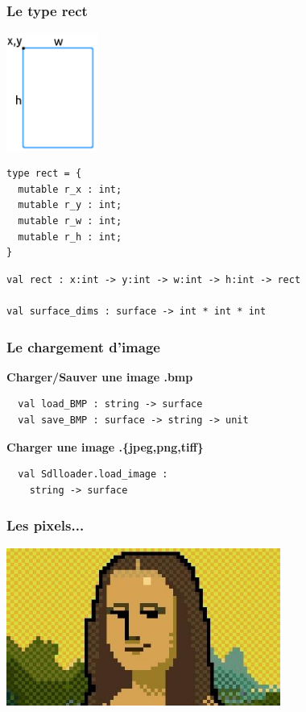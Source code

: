 \begin{frame}[fragile]
	\frametitle{Le type rect}
	\begin{center}\begin{minipage}{0.4\textwidth}
		\includegraphics[width=3cm]{pics/rect.png}
	\end{minipage}
	\begin{minipage}{0.4\textwidth}
		\lstset{basicstyle=\footnotesize}
		\begin{lstlisting}
type rect = {
  mutable r_x : int;
  mutable r_y : int;
  mutable r_w : int;
  mutable r_h : int;
} 
		\end{lstlisting}
	\end{minipage}\end{center}
	\lstset{basicstyle=\footnotesize}
	\begin{lstlisting}
val rect : x:int -> y:int -> w:int -> h:int -> rect

val surface_dims : surface -> int * int * int
	\end{lstlisting}
\end{frame}

\begin{frame}[fragile]
	\frametitle{Le chargement d'image}
	\textbf{Charger/Sauver une image .bmp}
	\begin{lstlisting}
  val load_BMP : string -> surface
  val save_BMP : surface -> string -> unit
	\end{lstlisting}
	\textbf{Charger une image .\{jpeg,png,tiff\}}
	\begin{lstlisting}
  val Sdlloader.load_image : 
    string -> surface

	\end{lstlisting}
\end{frame}

\begin{frame}
	\frametitle{Les pixels...}
	\begin{center}
		\includegraphics[width=9cm]{pics/Joconde-pixel.jpg}
	\end{center}
\end{frame}


